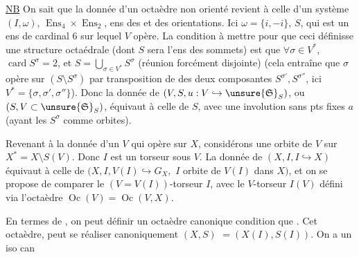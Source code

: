 \uline{NB} On sait que la donnée d'un octaèdre  non orienté
revient à celle d'un système $(I,\omega)$,  $\operatorname{Ens}_4\times\operatorname{Ens}_2$,
ens des  et des orientations. Ici $\omega=\{i,-i\}$, 
$S$, qui est un ens de cardinal 6 sur lequel $V$ opère.
La condition à mettre  pour que ceci définisse une
 structure octaédrale (dont $S$ sera l'ens des sommets)
est que $\forall\sigma\in V^*$,  $\operatorname{card}S^\sigma=2$, et $S=\bigcup_{\sigma\in V^*}S^\sigma$
(réunion forcément disjointe) (cela entraîne que
$\sigma$ opère sur $(S\setminus S^\sigma)$ par transposition de  des deux
composantes $S^{\sigma'},S^{\sigma''}$, ici $V^*=\{\sigma,\sigma',\sigma''\}$). Donc la
donnée de  $(V,S,u:V\hookrightarrow\unsure{\mathfrak S}_S)$, ou $(S,V\subset\unsure{\mathfrak S}_S)$,
équivaut à celle de $S$, avec une involution sans pts fixes
$a$ (ayant les $S^\sigma$ comme orbites).

Revenant à la donnée d'un $V$ qui opère  sur $X$,
considérons une orbite  de $V$ sur $X^*=X\setminus S(V)$.
Donc $I$ est un torseur sous $V$. La donnée de
$(X,I,I\hookrightarrow X)$ équivaut à celle de $(X,I,V(I)\hookrightarrow G_X,$
$I$ orbite de $V(I)$ dans $X)$, et on se propose de
comparer le $(V=V(I))$-torseur $I$, avec le
$V$-torseur $I(V)$  défini via l'octaèdre $\operatorname{Oc}(V)=\operatorname{Oc}(V,X)$.

En termes de , on peut définir un octaèdre 
canonique 
condition que  
.
Cet  octaèdre,  peut
se réaliser canoniquement  $(X,S)$
$=(X(I),S(I))$. On a un iso can
